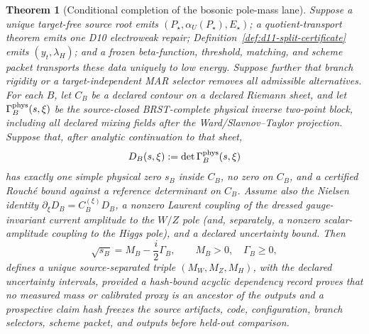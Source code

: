\documentclass[11pt]{article}
\newtheorem{theorem}{Theorem}[section]
\begin{document}






\begin{theorem}[Conditional completion of the bosonic pole-mass
lane]\label{thm:conditional-boson-pole-completion}
Suppose a unique target-free source root emits
\((P_\star,\alpha_U(P_\star),E_\star)\); a quotient-transport theorem emits one
D10 electroweak repair; Definition~\ref{def:d11-split-certificate} emits
\((y_t,\lambda_H)\); and a frozen beta-function, threshold, matching, and
scheme packet transports these data uniquely to low energy.  Suppose further
that branch rigidity or a target-independent MAR selector removes all
admissible alternatives.  For each \(B\), let \(C_B\) be a declared contour
on a declared Riemann sheet, and let \(\Gamma_B^{\rm phys}(s,\xi)\) be the
source-closed BRST-complete physical inverse two-point block, including all
declared mixing fields after the Ward/Slavnov--Taylor projection.  Suppose
that, after analytic continuation to that sheet,
\[
D_B(s,\xi):=\det\Gamma_B^{\rm phys}(s,\xi)
\]
has exactly one simple physical zero \(s_B\) inside \(C_B\), no zero on
\(C_B\), and a certified Rouch\'e bound against a reference determinant on
\(C_B\).  Assume also the Nielsen identity
\(\partial_\xi D_B=C_B^{(\xi)}D_B\), a nonzero Laurent coupling of the
dressed gauge-invariant current amplitude to the \(W/Z\) pole (and,
separately, a nonzero scalar-amplitude coupling to the Higgs pole), and a declared
uncertainty bound.  Then
\[
\sqrt{s_B}=M_B-\frac i2\Gamma_B,
\qquad M_B>0,\quad \Gamma_B\ge0,
\]
defines a unique source-separated triple \((M_W,M_Z,M_H)\), with the declared
uncertainty intervals, provided a hash-bound acyclic dependency record proves
that no measured mass or calibrated proxy is an ancestor of the outputs and a
prospective claim hash freezes the source artifacts, code, configuration,
branch selectors, scheme packet, and outputs before held-out comparison.
\end{theorem}
\end{document}
